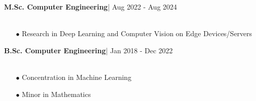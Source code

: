 \documentclass[10pt]{article}
\newcommand{\xfilll}[2][1ex]{
\dimen0=#2\advance\dimen0 by #1
\leaders\hrule height \dimen0 depth -#1\hfill}
\begin{document}
\textbf{\large M.Sc. Computer Engineering}|  \hfill { \small Aug 2022 - Aug 2024}
\\[-0.4cm]
\\[-0.6cm]	
	\begin{itemize}[itemsep = -0.75 mm, leftmargin=*]
        \item[{\color[RGB]{10,0,254}$\bullet$}] \noindent Research in Deep Learning and Computer Vision on Edge Devices/Servers
        \end{itemize} 
\textbf{\large B.Sc. Computer Engineering}|  \hfill { \small Jan 2018 - Dec 2022}
\\[-0.4cm]
\\[-0.6cm]	
	\begin{itemize}[itemsep = -0.75 mm, leftmargin=*]
        \item[{\color[RGB]{10,0,254}$\bullet$}] \noindent Concentration in Machine Learning
        \item[{\color[RGB]{10,0,254}$\bullet$}] \noindent Minor in Mathematics
        \end{itemize} 
\vspace{-15pt}



\end{document}
